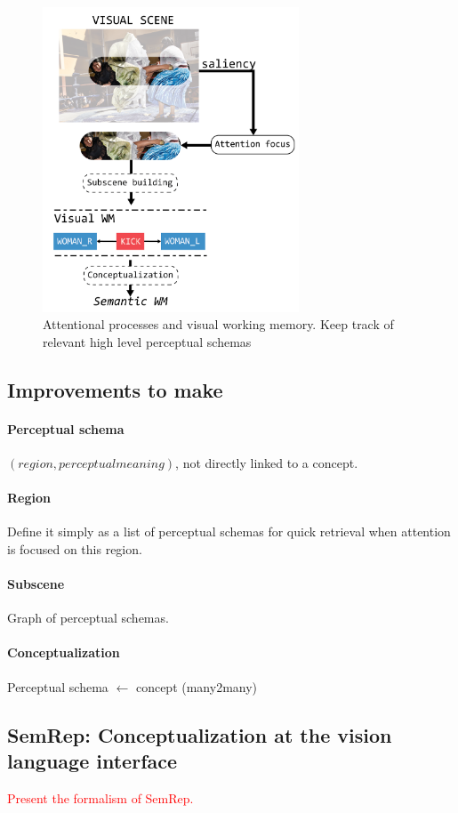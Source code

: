 \documentclass{article}
\newcommand\todo[1]{\textcolor{red}{#1}}
\begin{document}
\begin{figure}[H]
	\centering
	\includegraphics[width=3.0in]{Figures/vWM.png}
	\caption{Attentional processes and visual working memory. Keep track of relevant high level perceptual schemas}
	\label{fig:vWM}
\end{figure}

\subsection{Improvements to make}

\paragraph{Perceptual schema}
$(region, perceptualmeaning)$, not directly linked to a concept.
\paragraph{Region}
Define it simply as a list of perceptual schemas for quick retrieval when attention is focused on this region.
\paragraph{Subscene}
Graph of perceptual schemas.
\paragraph{Conceptualization}
Perceptual schema $\leftarrow$ concept (many2many)


\subsection{SemRep: Conceptualization at the vision language interface}
\todo{Present the formalism of SemRep.}
\end{document}
